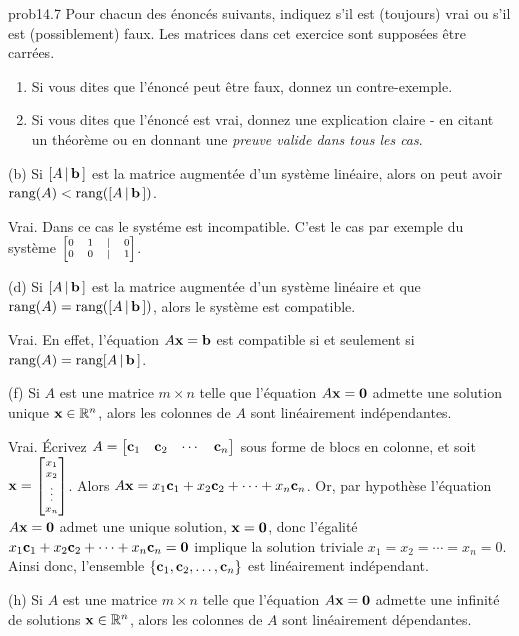 \bigskip
\begin{sol}{prob14.7} Pour chacun des énoncés suivants, indiquez s'il est (toujours) vrai ou s'il est (possiblement) faux.     Les matrices dans cet exercice sont supposées être carrées.  
   \smallskip    
\begin{enumerate}[$\bullet$]
\item Si vous dites que l'\'enonc\'e peut être faux, donnez un contre-exemple.   
\item Si vous dites que l'\'enonc\'e est vrai, donnez une explication claire - en citant un théorème ou en donnant une {\it preuve valide dans tous les cas}. 
\end{enumerate}
\medskip

(b) Si $[A\,|\,\mathbf{b}\,]$ est la matrice augmentée d'un système linéaire, alors on peut avoir $\textrm{rang} (A)<\textrm{rang}( [A\,|\,\mathbf{b}\,])$.
\medskip

\soln Vrai. Dans ce cas le syst\'eme est incompatible. C'est le cas par exemple du syst\`eme $\scriptsize\bmatrix  0 & 1 &|& 0 \\
 0 & 0 &|& 1 \endbmatrix$.
\medskip
 


(d)  Si $[A\,|\,\mathbf{b}\,]$ est la matrice augmentée d'un système linéaire et que  $\textrm{rang}(A)=\textrm{rang} ([A\,|\,\mathbf{b}\,])$, alors le système est compatible. 
 \medskip

\soln Vrai. En effet, l'équation $A\mathbf{x}=\mathbf{b}$ est compatible si et seulement si $\textrm{rang} (A)=\textrm{rang}  [A\,|\,\mathbf{b}\,]$.
 
 
\medskip

(f) Si $A$ est une matrice $m \times n$ telle que l'équation $A\mathbf{x}=\mathbf{0}$ admette une solution unique $\mathbf{x}\in \mathbb{R}^n$, alors les colonnes de $A$ sont linéairement indépendantes.
\medskip

\soln Vrai. \'Ecrivez $A= \bmatrix \cc_1&\cc_2&\cdots &\cc_n\endbmatrix$ sous forme de blocs en colonne, et soit $\xx= \scriptsize\bmatrix x_1\\x_2\\ \vdots\\x_n\endbmatrix$. Alors $A\mathbf{x}= x_1 \mathbf{c}_1 + x_2 \mathbf{c}_2 +\cdots +x_n\mathbf{c}_n$. 
Or, par hypothèse l'équation $A\mathbf{x}=\mathbf{0}$ admet une unique solution, $\mathbf{x}=\mathbf{0}$, donc l'égalité $x_1 \mathbf{c}_1 + x_2 \mathbf{c}_2 +\cdots +x_n\mathbf{c}_n=\mathbf{0}$ implique la solution triviale $x_1=x_2=\cdots=x_n=0$. Ainsi donc, l'ensemble $ \{\mathbf{c}_1, \mathbf{c}_2, \dots, \mathbf{c}_n \}$ est linéairement indépendant.
 
\medskip

(h)  Si $A$ est une matrice $m \times n$ telle que l'équation $A\mathbf{x}=\mathbf{0}$ admette une infinité de solutions $\mathbf{x}\in \mathbb{R}^n$, alors les colonnes de $A$ sont linéairement dépendantes.
 

\end{sol}
